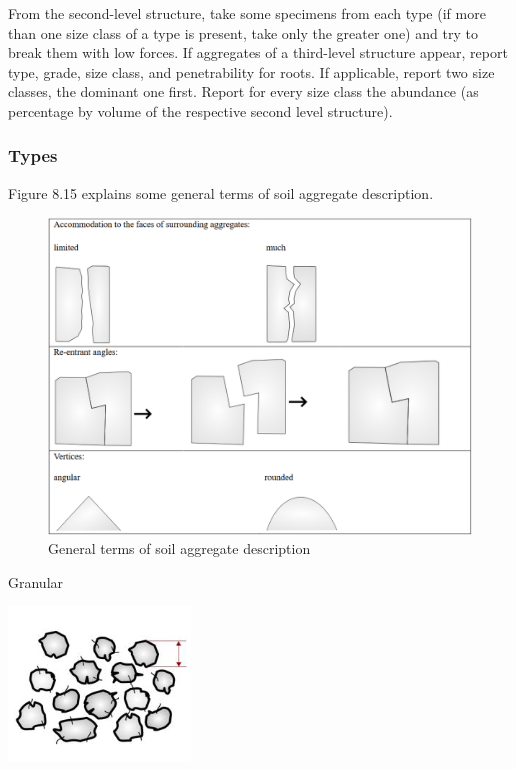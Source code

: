 \documentclass[
  letterpaper,
  DIV=11,
  numbers=noendperiod]{scrreprt}
\begin{document}
From the second-level structure, take some specimens from each type (if
more than one size class of a type is present, take only the greater
one) and try to break them with low forces. If aggregates of a
third-level structure appear, report type, grade, size class, and
penetrability for roots. If applicable, report two size classes, the
dominant one first. Report for every size class the abundance (as
percentage by volume of the respective second level structure).

\hypertarget{types}{%
\subsubsection{Types}\label{types}}

Figure 8.15 explains some general terms of soil aggregate description.

\begin{figure}

{\centering \includegraphics{./figure_8-15.png}

}

\caption{General terms of soil aggregate description}

\end{figure}

Granular

\includegraphics{./table_8-41-01.png}
\end{document}

